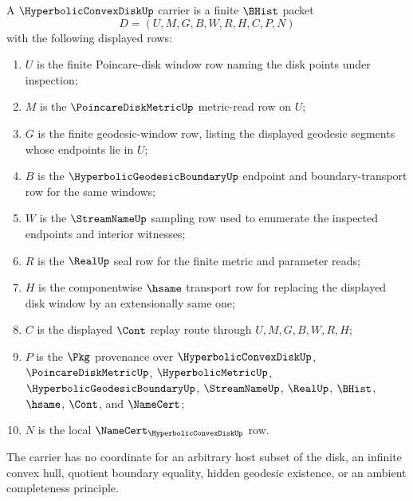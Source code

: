 \begin{definition}
\label{def:hyperbolic-convex-disk-carrier}
A $\HyperbolicConvexDiskUp$ carrier is a finite $\BHist$ packet
$$
D=(U,M,G,B,W,R,H,C,P,N)
$$
with the following displayed rows:
\begin{enumerate}
\item $U$ is the finite Poincare-disk window row naming the disk points under inspection;
\item $M$ is the $\PoincareDiskMetricUp$ metric-read row on $U$;
\item $G$ is the finite geodesic-window row, listing the displayed geodesic segments whose endpoints lie in $U$;
\item $B$ is the $\HyperbolicGeodesicBoundaryUp$ endpoint and boundary-transport row for the same windows;
\item $W$ is the $\StreamNameUp$ sampling row used to enumerate the inspected endpoints and interior witnesses;
\item $R$ is the $\RealUp$ seal row for the finite metric and parameter reads;
\item $H$ is the componentwise $\hsame$ transport row for replacing the displayed disk window by an extensionally same one;
\item $C$ is the displayed $\Cont$ replay route through $U,M,G,B,W,R,H$;
\item $P$ is the $\Pkg$ provenance over $\HyperbolicConvexDiskUp$, $\PoincareDiskMetricUp$, $\HyperbolicMetricUp$, $\HyperbolicGeodesicBoundaryUp$, $\StreamNameUp$, $\RealUp$, $\BHist$, $\hsame$, $\Cont$, and $\NameCert$;
\item $N$ is the local $\NameCert_{\HyperbolicConvexDiskUp}$ row.
\end{enumerate}
The carrier has no coordinate for an arbitrary host subset of the disk, an infinite convex hull, quotient boundary equality, hidden geodesic existence, or an ambient completeness principle.
\end{definition}

